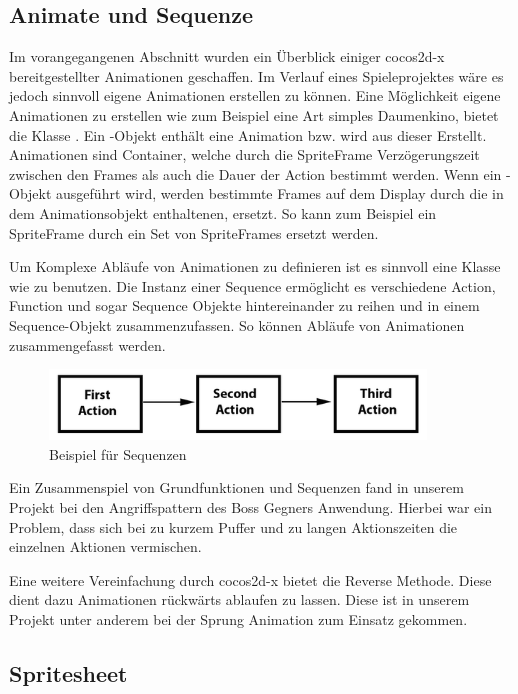 \subsection{Animate und Sequenze}
Im vorangegangenen Abschnitt wurden ein Überblick einiger cocos2d-x bereitgestellter Animationen geschaffen. Im Verlauf eines Spieleprojektes wäre es jedoch sinnvoll eigene Animationen erstellen zu können. Eine Möglichkeit eigene Animationen zu erstellen wie zum Beispiel eine Art simples Daumenkino, bietet die Klasse . Ein -Objekt enthält eine Animation bzw. wird aus dieser Erstellt. Animationen sind Container, welche durch die SpriteFrame Verzögerungszeit zwischen den Frames als auch die Dauer der Action bestimmt werden. Wenn ein -Objekt ausgeführt wird, werden bestimmte Frames auf dem Display durch die in dem Animationsobjekt enthaltenen, ersetzt. So kann zum Beispiel ein SpriteFrame durch ein Set von SpriteFrames ersetzt werden.

Um Komplexe Abläufe von Animationen zu definieren ist es sinnvoll eine Klasse wie  zu benutzen. Die Instanz einer Sequence ermöglicht es verschiedene Action, Function und sogar Sequence Objekte hintereinander zu reihen und in einem Sequence-Objekt zusammenzufassen. So können Abläufe von Animationen zusammengefasst werden.

\begin{figure}[H]
 \centering
  \includegraphics[width=10cm]{resources/sequence}
  \caption{Beispiel für Sequenzen}
  \label{fig:sequence} 
\end{figure}

Ein Zusammenspiel von Grundfunktionen und Sequenzen fand in unserem Projekt bei den Angriffspattern des Boss Gegners Anwendung. Hierbei war ein Problem, dass sich bei zu kurzem Puffer und zu langen Aktionszeiten die einzelnen Aktionen vermischen.

Eine weitere Vereinfachung durch cocos2d-x bietet die Reverse Methode. Diese dient dazu Animationen rückwärts ablaufen zu lassen. Diese ist in unserem Projekt unter anderem bei der Sprung Animation zum Einsatz gekommen.


\subsection{Spritesheet}


